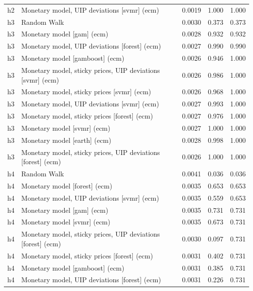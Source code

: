 \begin{ThreePartTable}
\begin{longtable}[t]{cp{5.5cm}ccc}
h2 & \raggedright Monetary model, UIP deviations [svmr] (ecm) & 0.0019 & 1.000 & 1.000\\
\addlinespace
h3 & \raggedright Random Walk & 0.0030 & 0.373 & 0.373\\
h3 & \raggedright Monetary model [gam] (ecm) & 0.0028 & 0.932 & 0.932\\
h3 & \raggedright Monetary model, UIP deviations [forest] (ecm) & 0.0027 & 0.990 & 0.990\\
h3 & \raggedright Monetary model [gamboost] (ecm) & 0.0026 & 0.946 & 1.000\\
h3 & \raggedright Monetary model, sticky prices, UIP deviations [svmr] (ecm) & 0.0026 & 0.986 & 1.000\\
h3 & \raggedright Monetary model, sticky prices [svmr] (ecm) & 0.0026 & 0.968 & 1.000\\
h3 & \raggedright Monetary model, UIP deviations [svmr] (ecm) & 0.0027 & 0.993 & 1.000\\
h3 & \raggedright Monetary model, sticky prices [forest] (ecm) & 0.0027 & 0.976 & 1.000\\
h3 & \raggedright Monetary model [svmr] (ecm) & 0.0027 & 1.000 & 1.000\\
h3 & \raggedright Monetary model [earth] (ecm) & 0.0028 & 0.998 & 1.000\\
h3 & \raggedright Monetary model, sticky prices, UIP deviations [forest] (ecm) & 0.0026 & 1.000 & 1.000\\
\addlinespace
h4 & \raggedright Random Walk & 0.0041 & 0.036 & 0.036\\
h4 & \raggedright Monetary model [forest] (ecm) & 0.0035 & 0.653 & 0.653\\
h4 & \raggedright Monetary model, UIP deviations [svmr] (ecm) & 0.0035 & 0.559 & 0.653\\
h4 & \raggedright Monetary model [gam] (ecm) & 0.0035 & 0.731 & 0.731\\
h4 & \raggedright Monetary model [svmr] (ecm) & 0.0035 & 0.673 & 0.731\\
h4 & \raggedright Monetary model, sticky prices, UIP deviations [forest] (ecm) & 0.0030 & 0.097 & 0.731\\
h4 & \raggedright Monetary model, sticky prices [forest] (ecm) & 0.0031 & 0.402 & 0.731\\
h4 & \raggedright Monetary model [gamboost] (ecm) & 0.0031 & 0.385 & 0.731\\
h4 & \raggedright Monetary model, UIP deviations [forest] (ecm) & 0.0031 & 0.226 & 0.731\\

\end{longtable}
\end{ThreePartTable}
